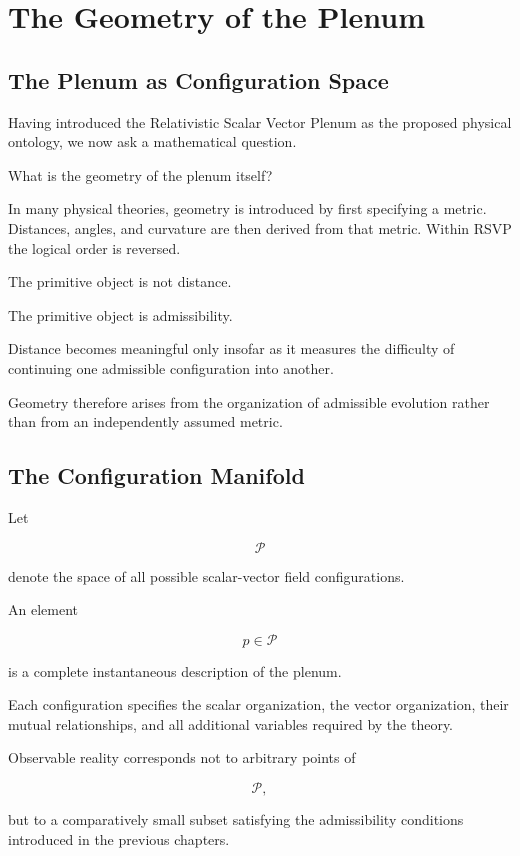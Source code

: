 \documentclass[11pt,oneside]{book}
\numberwithin{equation}{chapter}
\theoremstyle{definition}
\theoremstyle{plain}
\begin{document}
\chapter{The Geometry of the Plenum}

\section{The Plenum as Configuration Space}

Having introduced the Relativistic Scalar Vector Plenum as the proposed
physical ontology, we now ask a mathematical question.

What is the geometry of the plenum itself?

In many physical theories, geometry is introduced by first specifying a
metric. Distances, angles, and curvature are then derived from that metric.
Within RSVP the logical order is reversed.

The primitive object is not distance.

The primitive object is admissibility.

Distance becomes meaningful only insofar as it measures the difficulty of
continuing one admissible configuration into another.

Geometry therefore arises from the organization of admissible evolution
rather than from an independently assumed metric.

\section{The Configuration Manifold}

Let

\[
\mathcal{P}
\]

denote the space of all possible scalar-vector field configurations.

An element

\[
p \in \mathcal{P}
\]

is a complete instantaneous description of the plenum.

Each configuration specifies the scalar organization, the vector
organization, their mutual relationships, and all additional variables
required by the theory.

Observable reality corresponds not to arbitrary points of

\[
\mathcal{P},
\]

but to a comparatively small subset satisfying the admissibility conditions
introduced in the previous chapters.
\end{document}
